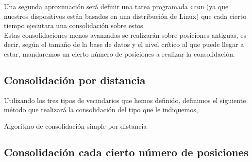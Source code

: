 \documentclass[a4paper, 12pt]{article}
\begin{document}
Una segunda aproximaci\'on ser\'a definir una tarea programada \texttt{cron} (ya que nuestros dispositivos est\'an basados en una distribuci\'on de Linux) que cada cierto tiempo ejecutara una consolidaci\'on sobre estos. \\

Estas consolidaciones menos avanzadas se realizar\'an sobre posiciones antiguas, es decir, seg\'un el tama\~no de la base de datos y el nivel cr\'itico al que puede llegar a estar, mandaremos un cierto n\'umero de posiciones a realizar la consolidaci\'on. \\

\subsection{Consolidaci\'on por distancia}

Utilizando los tres tipos de vecindarios que hemos definido, definimos el siguiente m\'etodo que realizar\'a la consolidaci\'on del tipo que le indiquemos, \\


\pagebreak

\begin{algorithm}[h]\label{consolidationByDistance}
\begin{algorithmic}[1]
        \Else
        \EndIf
    \EndIf
        \Else
        \EndIf
    \EndIf
        \Else
        \EndIf
    \EndIf
\EndFor
\EndFunction
\end{algorithmic}
\caption{\label{alg:consolidationByDinstace} Algoritmo de consolidaci\'on simple por distancia}
\end{algorithm}


\subsection{Consolidaci\'on cada cierto n\'umero de posiciones}
\end{document}
